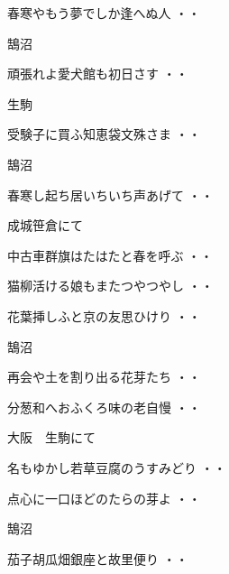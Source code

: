 \begin{shiika}春寒やもう夢でしか逢へぬ人
\hfill{・・}\end{shiika}
\vspace{0.4cm}
鵠沼
\begin{shiika}頑張れよ愛犬館も初日さす
\hfill{・・}\end{shiika}
\vspace{0.4cm}
生駒
\begin{shiika}受験子に買ふ知恵袋文殊さま
\hfill{・・}\end{shiika}
\vspace{0.4cm}
鵠沼
\begin{shiika}春寒し起ち居いちいち声あげて
\hfill{・・}\end{shiika}
\vspace{0.4cm}
成城笹倉にて
\begin{shiika}中古車群旗はたはたと春を呼ぶ
\hfill{・・}\end{shiika}
\begin{shiika}猫柳活ける娘もまたつやつやし
\hfill{・・}\end{shiika}
\begin{shiika}花葉挿しふと京の友思ひけり
\hfill{・・}\end{shiika}
\vspace{0.4cm}
鵠沼
\begin{shiika}再会や土を割り出る花芽たち
\hfill{・・}\end{shiika}
\begin{shiika}分葱和へおふくろ味の老自慢
\hfill{・・}\end{shiika}
\vspace{0.4cm}
大阪　生駒にて
\begin{shiika}名もゆかし若草豆腐のうすみどり
\hfill{・・}\end{shiika}
\begin{shiika}点心に一口ほどのたらの芽よ
\hfill{・・}\end{shiika}
\vspace{0.4cm}
鵠沼
\begin{shiika}茄子胡瓜畑銀座と故里便り
\hfill{・・}\end{shiika}

